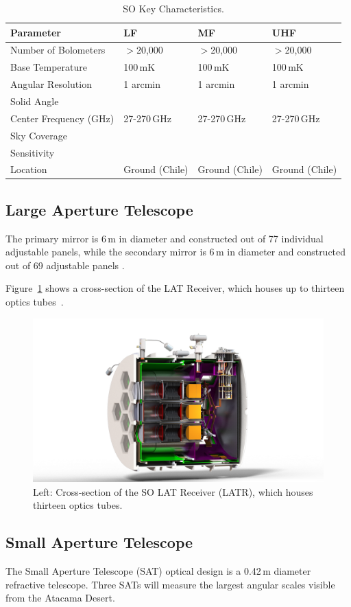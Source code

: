 \begin{table}[ht]
    \centering
    \begin{tabular}{|l|l|l|l|} \hline
        \textbf{ Parameter} &  \textbf{LF} &  \textbf{MF}  &  \textbf{UHF}  \\ \hline \hline
        Number of Bolometers & $>$20,000& $>$20,000& $>$20,000\\\hline
        Base Temperature & 100\,mK & 100\,mK & 100\,mK\\\hline
        Angular Resolution & 1 arcmin &1 arcmin &1 arcmin\\\hline
        Solid Angle & & &\\\hline
        Center Frequency (GHz) & 27-270\,GHz & 27-270\,GHz & 27-270\,GHz\\\hline
        Sky Coverage & & &\\\hline
        Sensitivity & & &\\\hline
        Location & Ground (Chile)& Ground (Chile)& Ground (Chile)\\
        \hline
    \end{tabular} \caption{SO Key Characteristics.}
    \label{tab:so}
\end{table}

\subsection{Large Aperture Telescope}
The primary mirror is 6\,m in diameter and constructed out of 77 individual adjustable panels, while the secondary mirror is 6\,m in diameter and constructed out of 69 adjustable panels \cite{gali18}.

Figure~\ref{fig:LATR_Cross} shows a cross-section of the LAT Receiver, which houses up to thirteen optics tubes~\cite{Xu_2021}.
\begin{figure}[H]
    \centering
    \includegraphics[width = .75\textwidth]{Figures/LATR_XSectionISO_HQ_20180328.png}
    \caption{Left: Cross-section of the SO LAT Receiver (LATR), which houses thirteen optics tubes.}
    \label{fig:LATR_Cross}
\end{figure}

\subsection{Small Aperture Telescope}

The Small Aperture Telescope (SAT) optical design is a 0.42\,m diameter refractive telescope.  Three SATs will measure the largest angular scales visible from the Atacama Desert.